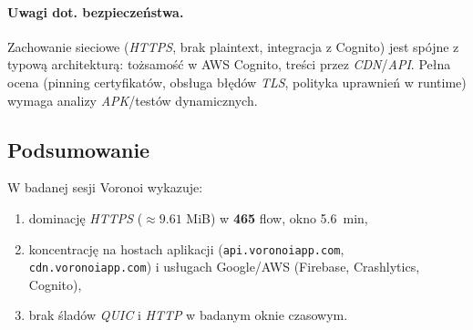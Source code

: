 \paragraph{Uwagi dot. bezpieczeństwa.}
Zachowanie sieciowe (\emph{HTTPS}, brak plaintext, integracja z Cognito) jest spójne z typową architekturą: tożsamość w AWS Cognito, treści przez \emph{CDN}/\emph{API}. Pełna ocena (pinning certyfikatów, obsługa błędów \emph{TLS}, polityka uprawnień w runtime) wymaga analizy \emph{APK}/testów dynamicznych.

\subsection{Podsumowanie}
W badanej sesji Voronoi wykazuje:
\begin{enumerate}
\item dominację \emph{HTTPS} ($\approx 9.61$ MiB) w \textbf{465} flow, okno \SI{5.6}{\minute},
\item koncentrację na hostach aplikacji (\texttt{api.voronoiapp.com}, \texttt{cdn.voronoiapp.com}) i usługach Google/AWS (Firebase, Crashlytics, Cognito),
\item brak śladów \emph{QUIC} i \emph{HTTP} w badanym oknie czasowym.
\end{enumerate}
